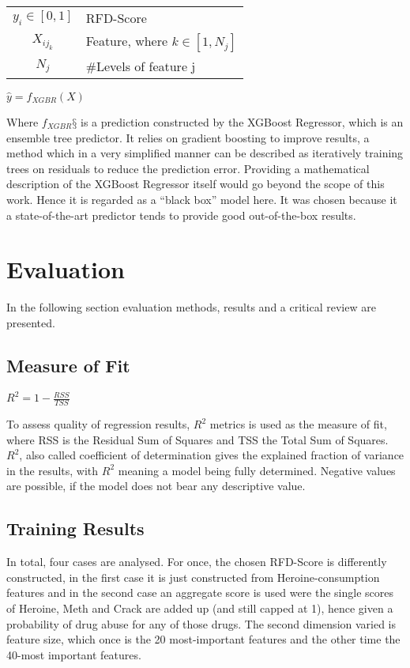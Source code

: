 \documentclass[12pt]{article}
\begin{document}
\begin{center}
	\begin{tabular}{cl}
		$y_i \in [0,1]$		& RFD-Score\\
		$X_{ij_k} $			& Feature, where $k\in[1,N_j]$\\
		$N_j$					& \#Levels of feature j\\
		

		

	\end{tabular}
		\vskip 0.5in
	$\hat{y}= f_{XGBR}(X)$
\end{center}

Where  $f_{XGBR}§$ is a prediction constructed by the XGBoost Regressor, which is an ensemble tree predictor. It relies on gradient boosting to improve results, a method which in a very simplified manner can be described as iteratively training trees on residuals to reduce the prediction error. Providing a mathematical description of the XGBoost Regressor itself would go beyond the scope of this work. Hence it is regarded as a “black box” model here. It was chosen because it a state-of-the-art predictor tends to provide good out-of-the-box results.

%
%
\newpage
\section{Evaluation}
In the following section evaluation methods, results and a critical review are presented.
\subsection{Measure of Fit}
\begin{center}
	$R^2= 1 - \frac{RSS}{TSS}$
\end{center}

To assess quality of regression results, $R^2$ metrics is used as the measure of fit, where RSS is the Residual Sum of Squares and TSS the Total Sum of Squares. $R^2$, also called coefficient of determination gives the explained fraction of variance in the results, with $R^2$ meaning a model being fully determined. Negative values are possible, if the model does not bear any descriptive value.


\subsection{Training Results}
In total, four cases are analysed. For once, the chosen RFD-Score is differently constructed, in the first case it is just constructed from Heroine-consumption features and in the second case an aggregate score is used were the single scores of Heroine, Meth and Crack are added up (and still capped at 1), hence given a probability of drug abuse for any of those drugs. The second dimension varied is feature size, which once is the 20 most-important features and the other time the 40-most important features.
\end{document}

